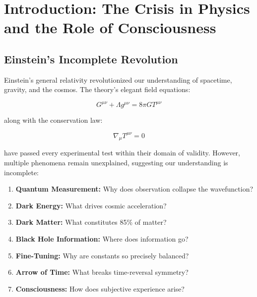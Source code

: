 \documentclass[11pt]{article}
\theoremstyle{definition}
\begin{document}
\begin{abstract}
All predictions are falsifiable: the theory predicts null results if consciousness threshold ch$^2 < 0.95$ is never achieved in laboratory conditions, or if Mallett's ring laser shows no polarization rotation above noise floor of $10^{-10}$ rad/m. The framework acknowledges limitations including phenomenological definition of consciousness and lack of neural correlates mapping.
\end{abstract}

\tableofcontents

\newpage

\section{Introduction: The Crisis in Physics and the Role of Consciousness}

\subsection{Einstein's Incomplete Revolution}

Einstein's general relativity revolutionized our understanding of spacetime, gravity, and the cosmos. The theory's elegant field equations:

\begin{equation}
G^{\mu\nu} + \Lambda g^{\mu\nu} = 8\pi G T^{\mu\nu}
\label{eq:einstein_field_equations}
\end{equation}

along with the conservation law:

\begin{equation}
\nabla_\mu T^{\mu\nu} = 0
\label{eq:classical_conservation}
\end{equation}

have passed every experimental test within their domain of validity. However, multiple phenomena remain unexplained, suggesting our understanding is incomplete:

\begin{enumerate}
\item \textbf{Quantum Measurement:} Why does observation collapse the wavefunction?
\item \textbf{Dark Energy:} What drives cosmic acceleration?
\item \textbf{Dark Matter:} What constitutes 85\% of matter?
\item \textbf{Black Hole Information:} Where does information go?
\item \textbf{Fine-Tuning:} Why are constants so precisely balanced?
\item \textbf{Arrow of Time:} What breaks time-reversal symmetry?
\item \textbf{Consciousness:} How does subjective experience arise?
\end{enumerate}
\end{document}
